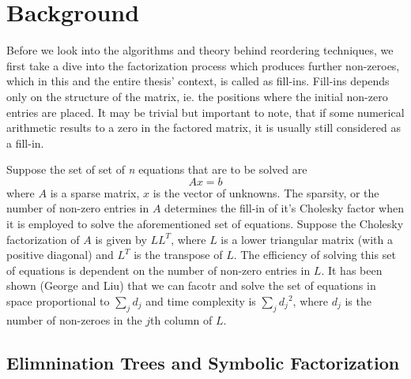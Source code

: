 

\chapter{Background}
\label{ch:background}



Before we look into the algorithms and theory behind reordering techniques, we first take a dive into the factorization process which produces further non-zeroes, which in this and the entire thesis' context, is called as fill-ins. Fill-ins depends only on the structure of the matrix, ie. the positions where the initial non-zero entries are placed. It may be trivial but important to note, that if some numerical arithmetic results to a zero in the factored matrix, it is usually still considered as a fill-in. 

Suppose the set of set of \textit{n} equations that are to be solved are
\begin{equation}
    Ax = b
\end{equation}
where \(A\) is a sparse matrix, \(x\) is the vector of unknowns. The sparsity, or the number of non-zero entries in \(A\) determines the fill-in of it's Cholesky factor when it is employed to solve the aforementioned set of equations. 
Suppose the Cholesky factorization of \(A\) is given by \(LL^T\), where \(L\) is a lower triangular matrix (with a positive diagonal) and \(L^T\) is the transpose of \(L\). The efficiency of solving this set of equations is dependent on the number of non-zero entries in \(L\). It has been shown (George and Liu) that we can facotr and solve the set of equations in space proportional to  \(\sum_j d_j\) and time complexity is  \(\sum_j {d_j}^2\), where \(d_j\) is the number of non-zeroes in the \(j\)th column of \(L\).



\section{Elimnination Trees and Symbolic Factorization}
\label{sec:elim_tree}

